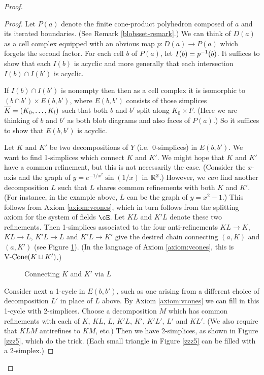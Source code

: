 \begin{proof}
\begin{proof}
Let $P(a)$ denote the finite cone-product polyhedron composed of $a$ and its iterated boundaries.
(See Remark \ref{blobsset-remark}.)
We can think of $D(a)$ as a cell complex equipped with an obvious
map $p: D(a) \to P(a)$ which forgets the second factor.
For each cell $b$ of $P(a)$, let $I(b) = p^{-1}(b)$.
It suffices to show that each $I(b)$ is acyclic and more generally that
each intersection $I(b)\cap I(b')$ is acyclic.

If $I(b)\cap I(b')$ is nonempty then then as a cell complex it is isomorphic to
$(b\cap b') \times E(b, b')$, where $E(b, b')$ consists of those simplices
$\overline{K} = (K_0,\ldots,K_l)$ such that both $b$ and $b'$ split along $K_0\times F$.
(Here we are thinking of $b$ and $b'$ as both blob diagrams and also faces of $P(a)$.)
So it suffices to show that $E(b, b')$ is acyclic.

Let $K$ and $K'$ be two decompositions of $Y$ (i.e.\ 0-simplices) in $E(b, b')$.
We want to find 1-simplices which connect $K$ and $K'$.
We might hope that $K$ and $K'$ have a common refinement, but this is not necessarily
the case.
(Consider the $x$-axis and the graph of $y = e^{-1/x^2} \sin(1/x)$ in $\mathbb{R}^2$.)
However, we {\it can} find another decomposition $L$ such that $L$ shares common
refinements with both $K$ and $K'$. (For instance, in the example above, $L$ can be the graph of $y=x^2-1$.)
This follows from Axiom \ref{axiom:vcones}, which in turn follows from the
splitting axiom for the system of fields $\cE$.
Let $KL$ and $K'L$ denote these two refinements.
Then 1-simplices associated to the four anti-refinements
$KL\to K$, $KL\to L$, $K'L\to L$ and $K'L\to K'$
give the desired chain connecting $(a, K)$ and $(a, K')$
(see Figure \ref{zzz4}).
(In the language of Axiom \ref{axiom:vcones}, this is $\text{V-Cone}(K \sqcup K')$.)

\begin{figure}[t] \centering
{}
\caption{Connecting $K$ and $K'$ via $L$}
\label{zzz4}
\end{figure}

Consider next a 1-cycle in $E(b, b')$, such as one arising from
a different choice of decomposition $L'$ in place of $L$ above.
By Axiom \ref{axiom:vcones} we can fill in this 1-cycle with 2-simplices.
Choose a decomposition $M$ which has common refinements with each of 
$K$, $KL$, $L$, $K'L$, $K'$, $K'L'$, $L'$ and $KL'$.
(We also require that $KLM$ antirefines to $KM$, etc.)
Then we have 2-simplices, as shown in Figure \ref{zzz5}, which do the trick.
(Each small triangle in Figure \ref{zzz5} can be filled with a 2-simplex.)


\end{proof}
\end{proof}
